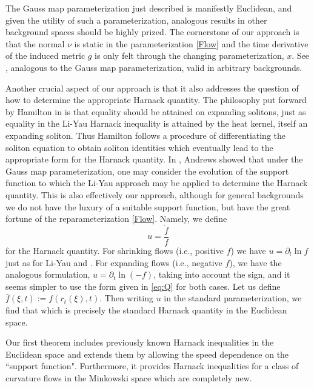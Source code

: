 The Gauss map parameterization just described is manifestly Euclidean, and given the utility of such a parameterization, analogous results in other background spaces should be highly prized. The cornerstone of our approach is that the normal \(\nu\) is static in the parameterization \eqref{Flow} and the time derivative of the induced metric \(g\) is only felt through the changing parameterization, $x$. See , analogous to the Gauss map parameterization, valid in arbitrary backgrounds.

Another crucial aspect of our approach is that it also addresses the question of how to determine the appropriate Harnack quantity. The philosophy put forward by Hamilton in \cite{Hamilton:/1993,Hamilton:/1995} is that equality should be attained on expanding solitons, just as equality in the Li-Yau Harnack inequality \cite{LiYau:/1986} is attained by the heat kernel, itself an expanding soliton. Thus Hamilton follows a procedure of differentiating the soliton equation to obtain soliton identities which eventually lead to the appropriate form for the Harnack quantity. In \cite{Andrews:09/1994}, Andrews showed that under the Gauss map parameterization, one may consider the evolution of the support function to which the Li-Yau approach may be applied to determine the Harnack quantity. This is also effectively our approach, although for general backgrounds we do not have the luxury of a suitable support function, but have the great fortune of the reparameterization \eqref{Flow}. Namely, we define
\begin{equation}
\label{eq:Q}
u = \frac{\dot{f}}{f}
\end{equation}
for the Harnack quantity. For shrinking flows (i.e., positive $f$) we have $u = \partial_t \ln f$ just as for Li-Yau \cite{LiYau:/1986} and \cite{Andrews:09/1994}. For expanding flows (i.e., negative $f$), we have the analogous formulation, $u =\partial_t \ln (-f)$, taking into account the sign, and it seems simpler to use the form given in \eqref{eq:Q} for both cases. Let us define $\bar{f}(\xi,t):=f(r_t(\xi), t).$ Then writing $u$ in the standard parameterization, we find that
which is precisely the standard Harnack quantity in the Euclidean space.


Our first theorem includes previously known Harnack inequalities in the Euclidean space and extends them by allowing the speed dependence on the ``support function". Furthermore, it provides Harnack inequalities for a class of curvature flows in the Minkowski space which are completely new.

